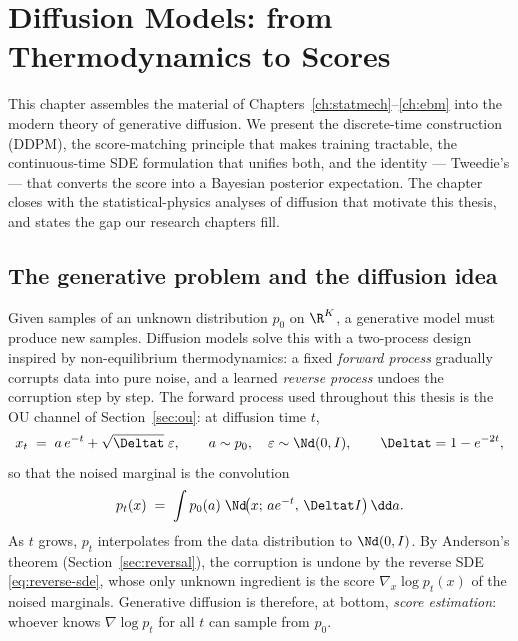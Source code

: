\chapter{Diffusion Models: from Thermodynamics to Scores}\label{ch:diffusion}

This chapter assembles the material of
Chapters~\ref{ch:statmech}--\ref{ch:ebm} into the modern theory of
generative diffusion. We present the discrete-time construction (DDPM), the
score-matching principle that makes training tractable, the continuous-time
SDE formulation that unifies both, and the identity --- Tweedie's --- that
converts the score into a Bayesian posterior expectation. The chapter closes
with the statistical-physics analyses of diffusion that motivate this
thesis, and states the gap our research chapters fill.

\section{The generative problem and the diffusion idea}

Given samples of an unknown distribution $p_0$ on $\R^K$, a generative model
must produce new samples. Diffusion models
\citep{sohl2015deep, ho2020denoising, song2021scorebased} solve this with a
two-process design inspired by non-equilibrium thermodynamics:
a fixed \emph{forward process} gradually corrupts data into pure noise, and
a learned \emph{reverse process} undoes the corruption step by step. The
forward process used throughout this thesis is the OU channel of
Section~\ref{sec:ou}: at diffusion time $t$,
\begin{equation}
  x_t \;=\; a\, e^{-t} + \sqrt{\Deltat}\;\varepsilon,
  \qquad a \sim p_0,\quad \varepsilon \sim \Nd(0, I),
  \qquad \Deltat = 1 - e^{-2t},
  \label{eq:forward-marginal}
\end{equation}
so that the noised marginal is the convolution
\begin{equation}
  p_t(x) \;=\; \int p_0(a)\; \Nd\!\big(x;\, a e^{-t},\, \Deltat I\big)\,
  \dd a .
  \label{eq:pt-convolution}
\end{equation}
As $t$ grows, $p_t$ interpolates from the data distribution to
$\Nd(0, I)$. By Anderson's theorem (Section~\ref{sec:reversal}), the
corruption is undone by the reverse SDE \eqref{eq:reverse-sde}, whose only
unknown ingredient is the score $\nabla_x \log p_t(x)$ of the noised
marginals. Generative diffusion is therefore, at bottom, \emph{score
estimation}: whoever knows $\nabla \log p_t$ for all $t$ can sample from
$p_0$.

